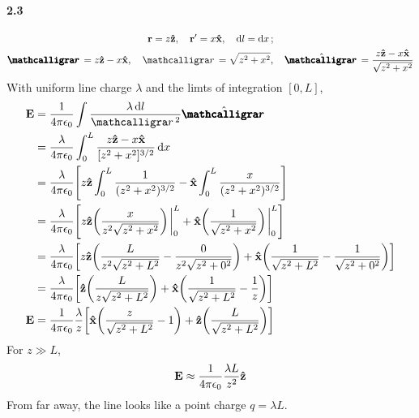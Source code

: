 \documentclass[../main.tex]{subfiles}
\begin{document}
\paragraph{2.3}
\begin{gather*}
    \vb{r} = z \vu{z} ,\quad \vb{r}' = x \vu{x} ,\quad \dd{l} = \dd{x}; \\
    \boldscriptr = z \vu{z} - x \vu{x} ,\quad \scriptr = \sqrt{z^2 + x^2} ,\quad 
        \hat \boldscriptr = \frac{z \vu{z} - x \vu{x}}{\sqrt{z^2 + x^2}}
\end{gather*}
With uniform line charge $\lambda$ and the limts of integration $[0,L]$,
\begin{align*}
    \vb{E} &= \frac{1}{4\pi\epsilon_0} \int \frac{\lambda \dd{l}}{\scriptr^2} \hat \boldscriptr \\
    &= \frac{\lambda}{4\pi\epsilon_0}
    \int_0^L \frac{z \vu{z} - x \vu{x}}{[z^2 + x^2]^{3/2}} \dd{x} \\
    &= \frac{\lambda}{4\pi\epsilon_0} \qt[
        z \vu{z} \int_0^L \frac{1}{(z^2 + x^2)^{3/2}}
        - \vu{x} \int_0^L \frac{x}{(z^2 + x^2)^{3/2}}
    ] \\
    &= \frac{\lambda}{4\pi\epsilon_0} \qt[
        z \vu{z} \qt(\frac{x}{z^2 \sqrt{z^2 + x^2}}) \eval_0^L
        + \vu{x} \qt(\frac{1}{\sqrt{z^2 + x^2}}) \eval_0^L
    ] \\
    &= \frac{\lambda}{4\pi\epsilon_0} \qt[
        z \vu{z} \qt(\frac{L}{z^2 \sqrt{z^2 + L^2}} - \frac{0}{z^2 \sqrt{z^2 + 0^2}})
        + \vu{x} \qt(\frac{1}{\sqrt{z^2 + L^2}} - \frac{1}{\sqrt{z^2 + 0^2}})
    ] \\
    &= \frac{\lambda}{4\pi\epsilon_0} \qt[
        \vu{z} \qt(\frac{L}{z \sqrt{z^2 + L^2}})
        + \vu{x} \qt(\frac{1}{\sqrt{z^2 + L^2}} - \frac{1}{z})
    ] \\
   \vb{E} &= \frac{1}{4\pi\epsilon_0} \frac{\lambda}{z} \qt[
        \vu{x} \qt(\frac{z}{\sqrt{z^2 + L^2}} - 1) +
        \vu{z} \qt(\frac{L}{\sqrt{z^2 + L^2}})
    ]
\end{align*}
For $z \gg L$,
\begin{align*}
    \vb{E} \approx \frac{1}{4\pi\epsilon_0} \frac{\lambda L}{z^2} \vu{z}
\end{align*}
From far away, the line looks like a point charge $q = \lambda L$.
\end{document}
